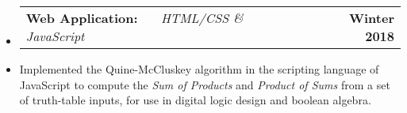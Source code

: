 \documentclass[10pt,letterpaper]{article}
\makeatletter
\newcommand{\header}[2]
{
	\begin{tabular*}{\linewidth}{l @{\extracolsep{\fill}} r}
		\hspace{-27pt} #1 & #2 \\
	\end{tabular*}
}
\makeatother
\begin{document}
\begin{itemize}
	\item[]
		\header
		{	
			\textbf{Web Application: }
			\href{https://aashpointo.github.io/KmapWebsite/}{\emph{\underline{\smash{aashpointo.github.io/KmapWebsite}}}} \ \ \ \footnotesize \emph{HTML/CSS \& JavaScript}
		}
		{\textbf{Winter 2018}}
	\item
		Implemented the Quine-McCluskey algorithm in the scripting language of JavaScript to compute the \emph{Sum of Products} and \emph{Product of Sums} from a set of truth-table inputs, for use in digital logic design and boolean algebra.

\end{itemize}
\end{document}
